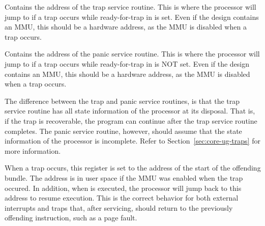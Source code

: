 \implementation{}


Contains the address of the trap service routine. This is where the processor
will jump to if a trap occurs while ready-for-trap in  is set. Even if
the design contains an MMU, this should be a hardware address, as the MMU is
disabled when a trap occurs.

\implementation{}


Contains the address of the panic service routine. This is where the processor
will jump to if a trap occurs while ready-for-trap in  is NOT set.
Even if the design contains an MMU, this should be a hardware address, as the
MMU is disabled when a trap occurs.

The difference between the trap and panic service routines, is that the trap
service routine has all state information of the processor at its disposal. That
is, if the trap is recoverable, the program can continue after the trap service
routine completes. The panic service routine, however, should assume that the
state information of the processor is incomplete. Refer to
Section~\ref{sec:core-ug-traps} for more information.

\implementation{}


When a trap occurs, this register is set to the address of the start of the
offending bundle. The address is in user space if the MMU was enabled when the
trap occured. In addition, when  is executed, the processor will jump
back to this address to resume execution. This is the correct behavior for both
external interrupts and traps that, after servicing, should return to the
previously offending instruction, such as a page fault.

